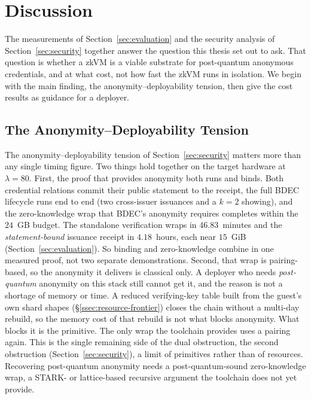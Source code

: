 \section{Discussion}\label{sec:discussion}
The measurements of Section~\ref{sec:evaluation} and the security analysis of Section~\ref{sec:security} together answer the question this thesis set out to ask. That question is whether a zkVM is a viable substrate for post-quantum anonymous credentials, and at what cost, not how fast the zkVM runs in isolation. We begin with the main finding, the anonymity--deployability tension, then give the cost results as guidance for a deployer.

\subsection{The Anonymity--Deployability Tension}\label{ssec:tension-discussion}
The anonymity--deployability tension of Section~\ref{sec:security} matters more than any single timing figure. Two things hold together on the target hardware at $\lambda=80$. First, the proof that provides anonymity both runs and binds. Both credential relations commit their public statement to the receipt, the full BDEC lifecycle runs end to end (two cross-issuer issuances and a $k=2$ showing), and the zero-knowledge wrap that BDEC's anonymity requires completes within the $24$~GB budget. The standalone verification wraps in $46.83$~minutes and the \emph{statement-bound} issuance receipt in $4.18$~hours, each near $15$~GiB (Section~\ref{sec:evaluation}). So binding and zero-knowledge combine in one measured proof, not two separate demonstrations. Second, that wrap is pairing-based, so the anonymity it delivers is classical only. A deployer who needs \emph{post-quantum} anonymity on this stack still cannot get it, and the reason is not a shortage of memory or time. A reduced verifying-key table built from the guest's own shard shapes (\S\ref{ssec:resource-frontier}) closes the chain without a multi-day rebuild, so the memory cost of that rebuild is not what blocks anonymity. What blocks it is the primitive. The only wrap the toolchain provides uses a pairing again. This is the single remaining side of the dual obstruction, the second obstruction (Section~\ref{sec:security}), a limit of primitives rather than of resources. Recovering post-quantum anonymity needs a post-quantum-sound zero-knowledge wrap, a STARK- or lattice-based recursive argument the toolchain does not yet provide.

